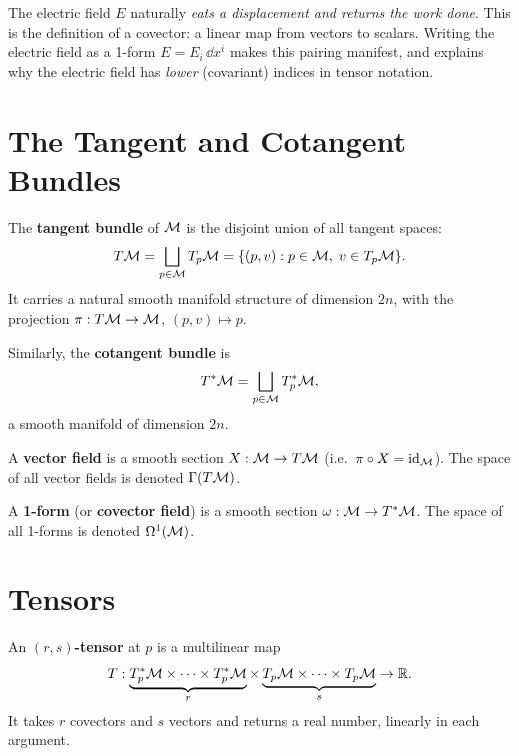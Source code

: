 \begin{remark}
The electric field $E$ naturally \emph{eats a displacement and returns the work done}. This is the definition of a covector: a linear map from vectors to scalars. Writing the electric field as a 1-form $E = E_i\,\dd x^i$ makes this pairing manifest, and explains why the electric field has \emph{lower} (covariant) indices in tensor notation.
\end{remark}

\section{The Tangent and Cotangent Bundles}

\begin{definition}
The \textbf{tangent bundle} of $\mathcal{M}$ is the disjoint union of all tangent spaces:
\begin{equation}
T\mathcal{M} = \bigsqcup_{p \in \mathcal{M}} T_p\mathcal{M} = \{(p, v) : p \in \mathcal{M},\; v \in T_p\mathcal{M}\}.
\end{equation}
It carries a natural smooth manifold structure of dimension $2n$, with the projection $\pi: T\mathcal{M} \to \mathcal{M}$, $(p,v) \mapsto p$.
\end{definition}

\begin{definition}
Similarly, the \textbf{cotangent bundle} is
\begin{equation}
T^*\mathcal{M} = \bigsqcup_{p \in \mathcal{M}} T_p^*\mathcal{M},
\end{equation}
a smooth manifold of dimension $2n$.
\end{definition}

\begin{definition}
A \textbf{vector field} is a smooth section $X: \mathcal{M} \to T\mathcal{M}$ (i.e.\ $\pi \circ X = \mathrm{id}_{\mathcal{M}}$). The space of all vector fields is denoted $\Gamma(T\mathcal{M})$.

A \textbf{1-form} (or \textbf{covector field}) is a smooth section $\omega: \mathcal{M} \to T^*\mathcal{M}$. The space of all 1-forms is denoted $\Omega^1(\mathcal{M})$.
\end{definition}

\section{Tensors}

\begin{definition}
An \textbf{$(r,s)$-tensor} at $p$ is a multilinear map
\begin{equation}
T: \underbrace{T_p^*\mathcal{M} \times \cdots \times T_p^*\mathcal{M}}_{r} \times \underbrace{T_p\mathcal{M} \times \cdots \times T_p\mathcal{M}}_{s} \to \mathbb{R}.
\end{equation}
It takes $r$ covectors and $s$ vectors and returns a real number, linearly in each argument.
\end{definition}

